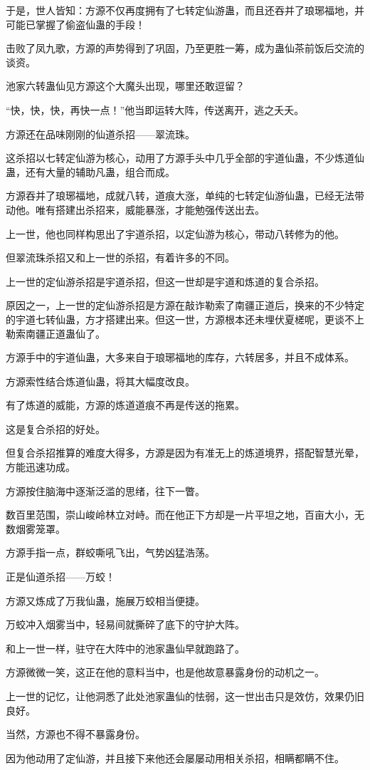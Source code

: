 \begin{this_body}
于是，世人皆知：方源不仅再度拥有了七转定仙游蛊，而且还吞并了琅琊福地，并可能已掌握了偷盗仙蛊的手段！

击败了凤九歌，方源的声势得到了巩固，乃至更胜一筹，成为蛊仙茶前饭后交流的谈资。

池家六转蛊仙见方源这个大魔头出现，哪里还敢逗留？

“快，快，快，再快一点！”他当即运转大阵，传送离开，逃之夭夭。

方源还在品味刚刚的仙道杀招——翠流珠。

这杀招以七转定仙游为核心，动用了方源手头中几乎全部的宇道仙蛊，不少炼道仙蛊，还有大量的辅助凡蛊，组合而成。

方源吞并了琅琊福地，成就八转，道痕大涨，单纯的七转定仙游仙蛊，已经无法带动他。唯有搭建出杀招来，威能暴涨，才能勉强传送出去。

上一世，他也同样构思出了宇道杀招，以定仙游为核心，带动八转修为的他。

但翠流珠杀招又和上一世的杀招，有着许多的不同。

上一世的定仙游杀招是宇道杀招，但这一世却是宇道和炼道的复合杀招。

原因之一，上一世的定仙游杀招是方源在敲诈勒索了南疆正道后，换来的不少特定的宇道七转仙蛊，方才搭建出来。但这一世，方源根本还未埋伏夏槎呢，更谈不上勒索南疆正道蛊仙了。

方源手中的宇道仙蛊，大多来自于琅琊福地的库存，六转居多，并且不成体系。

方源索性结合炼道仙蛊，将其大幅度改良。

有了炼道的威能，方源的炼道道痕不再是传送的拖累。

这是复合杀招的好处。

但复合杀招推算的难度大得多，方源是因为有准无上的炼道境界，搭配智慧光晕，方能迅速功成。

方源按住脑海中逐渐泛滥的思绪，往下一瞥。

数百里范围，崇山峻岭林立对峙。而在他正下方却是一片平坦之地，百亩大小，无数烟雾笼罩。

方源手指一点，群蛟嘶吼飞出，气势凶猛浩荡。

正是仙道杀招——万蛟！

方源又炼成了万我仙蛊，施展万蛟相当便捷。

万蛟冲入烟雾当中，轻易间就撕碎了底下的守护大阵。

和上一世一样，驻守在大阵中的池家蛊仙早就跑路了。

方源微微一笑，这正在他的意料当中，也是他故意暴露身份的动机之一。

上一世的记忆，让他洞悉了此处池家蛊仙的怯弱，这一世出击只是效仿，效果仍旧良好。

当然，方源也不得不暴露身份。

因为他动用了定仙游，并且接下来他还会屡屡动用相关杀招，相瞒都瞒不住。

\end{this_body}


